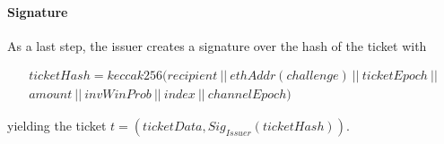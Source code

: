 \paragraph{Signature}
\label{sec:tickets:issuance:channelepoch}

As a last step, the issuer creates a signature over the hash of the ticket with

\begin{multline*}
      ticketHash = keccak256 (recipient \ || \ ethAddr(challenge) \ || \ ticketEpoch \ ||  \\
      amount \ || \ invWinProb \ || \ index \ || \ channelEpoch)
\end{multline*}

yielding the ticket $t = (ticketData, Sig_{Issuer}(ticketHash))$.